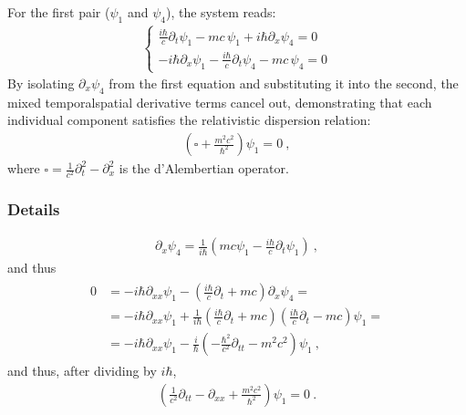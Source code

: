 \documentclass[letterpaper,10pt,english]{jupyterBook}
\begin{document}
\sphinxAtStartPar
For the first pair (\(\psi_1\) and \(\psi_4\)), the system reads:
\begin{equation*}
\begin{split}\begin{cases}
\frac{i\hbar}{c} \partial_t \psi_1 - mc \, \psi_1 + i\hbar \partial_x \psi_4 = 0 \\[6pt]
-i\hbar \partial_x \psi_1 - \frac{i\hbar}{c} \partial_t \psi_4 - mc \, \psi_4 = 0
\end{cases}\end{split}
\end{equation*}
\sphinxAtStartPar
{}
By isolating \(\partial_x \psi_4\) from the first equation and substituting it into the second, the mixed temporal\sphinxhyphen{}spatial derivative terms cancel out, demonstrating that each individual component satisfies the relativistic dispersion relation:
\begin{equation*}
\begin{split}\left( \square + \frac{m^2 c^2}{\hbar^2} \right) \psi_1 = 0 \ ,\end{split}
\end{equation*}
\sphinxAtStartPar
where \(\square = \frac{1}{c^2}\partial_t^2 - \partial_x^2\) is the d’Alembertian operator.
\subsubsection*{Details}
\begin{equation*}
\begin{split}\partial_x \psi_4 = \frac{1}{i\hbar} \left( m c \psi_1 - \frac{i \hbar}{c} \partial_t \psi_1 \right) \ ,\end{split}
\end{equation*}
\sphinxAtStartPar
and thus
\begin{equation*}
\begin{split}\begin{aligned}
  0 
  & = -i \hbar \partial_{xx} \psi_1 - \left( \frac{i \hbar}{c} \partial_t + m c \right) \partial_x \psi_4 = \\
  & = -i \hbar \partial_{xx} \psi_1 + \frac{1}{i \hbar} \left( \frac{i \hbar}{c} \partial_t + m c \right) \left( \frac{i \hbar}{c} \partial_t - m c  \right) \psi_1 = \\
  & = - i \hbar \partial_{xx} \psi_1 - \frac{i}{\hbar} \left( - \frac{\hbar^2}{c^2} \partial_{tt} - m^2 c^2 \right) \psi_1 \ ,
\end{aligned}\end{split}
\end{equation*}
\sphinxAtStartPar
and thus, after dividing by \(i \hbar\),
\begin{equation*}
\begin{split}\left( \frac{1}{c^2} \partial_{tt} - \partial_{xx} + \frac{m^2 c^2}{\hbar^2} \right) \psi_1 = 0 \ .\end{split}
\end{equation*}
\end{document}
